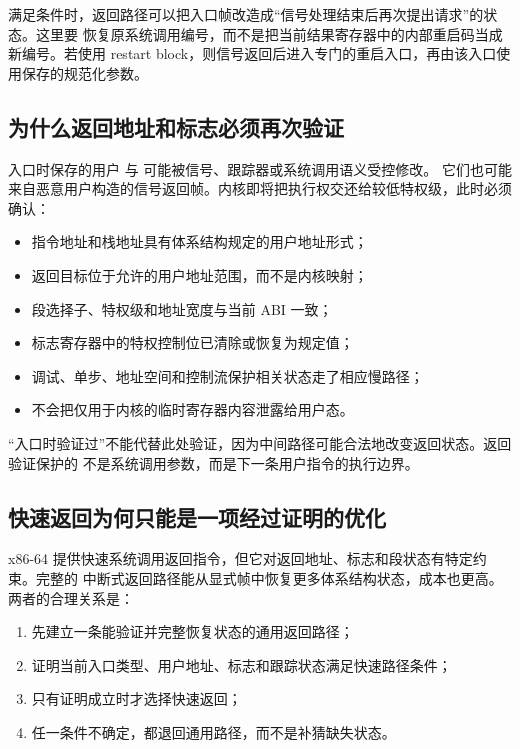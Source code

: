 满足条件时，返回路径可以把入口帧改造成“信号处理结束后再次提出请求”的状态。这里要
恢复原系统调用编号，而不是把当前结果寄存器中的内部重启码当成新编号。若使用 restart
block，则信号返回后进入专门的重启入口，再由该入口使用保存的规范化参数。

\subsection{为什么返回地址和标志必须再次验证}

入口时保存的用户  与  可能被信号、跟踪器或系统调用语义受控修改。
它们也可能来自恶意用户构造的信号返回帧。内核即将把执行权交还给较低特权级，此时必须
确认：

\begin{itemize}
\tightlist
\item 指令地址和栈地址具有体系结构规定的用户地址形式；
\item 返回目标位于允许的用户地址范围，而不是内核映射；
\item 段选择子、特权级和地址宽度与当前 ABI 一致；
\item 标志寄存器中的特权控制位已清除或恢复为规定值；
\item 调试、单步、地址空间和控制流保护相关状态走了相应慢路径；
\item 不会把仅用于内核的临时寄存器内容泄露给用户态。
\end{itemize}

“入口时验证过”不能代替此处验证，因为中间路径可能合法地改变返回状态。返回验证保护的
不是系统调用参数，而是下一条用户指令的执行边界。

\subsection{快速返回为何只能是一项经过证明的优化}

x86-64 提供快速系统调用返回指令，但它对返回地址、标志和段状态有特定约束。完整的
中断式返回路径能从显式帧中恢复更多体系结构状态，成本也更高。两者的合理关系是：

\begin{enumerate}
\tightlist
\item 先建立一条能验证并完整恢复状态的通用返回路径；
\item 证明当前入口类型、用户地址、标志和跟踪状态满足快速路径条件；
\item 只有证明成立时才选择快速返回；
\item 任一条件不确定，都退回通用路径，而不是补猜缺失状态。
\end{enumerate}

